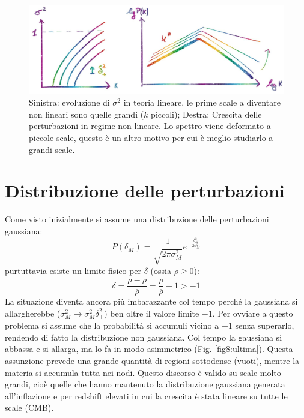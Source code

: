 \begin{figure}[H]
    \centering
    \includegraphics[width=.85 \textwidth]{Pictures/8/truevol.jpg}
    \vspace*{-1em}
    \caption{Sinistra: evoluzione di $\sigma^2$ in teoria lineare, le prime scale a diventare non lineari sono quelle grandi ($k$ piccoli); Destra: Crescita delle perturbazioni in regime non lineare. Lo spettro viene deformato a piccole scale, questo è un altro motivo per cui è meglio studiarlo a  grandi scale.}\label{fig8:ultimabella}
\end{figure}


\section{Distribuzione delle perturbazioni}
Come visto inizialmente si assume una distribuzione delle perturbazioni gaussiana:
\begin{equation}
    P(\delta_M)=\frac{1}{\sqrt{2\pi \sigma_M^2}}e^{-\frac{\delta_M^2}{2\sigma_M^2}}
\end{equation}
purtuttavia esiste un limite fisico per $\delta$ (ossia $\rho \geq 0$):
\begin{equation}
    \delta = \frac{\rho - \overbar{\rho}}{\overbar{\rho}} = \frac{\rho}{\overbar{\rho}}-1 > -1
\end{equation}
La situazione diventa ancora più imbarazzante col tempo perché la gaussiana si allargherebbe ($\sigma_M^2 \to \sigma_M^2 \delta_+^2$) ben oltre il valore limite $-1$. Per ovviare a questo problema si assume che la probabilità si accumuli vicino a $-1$ senza superarlo, rendendo di fatto la distribuzione non gaussiana. Col tempo la gaussiana si abbassa e si allarga, ma lo fa in modo asimmetrico (Fig. \ref{fig8:ultima}). Questa assunzione prevede una grande quantità di regioni sottodense (vuoti), mentre la materia si accumula tutta nei nodi. Questo discorso è valido su scale molto grandi, cioè quelle che hanno mantenuto la distribuzione gaussiana generata all’inflazione e per redshift elevati in cui la crescita è stata lineare su tutte le scale (CMB).

